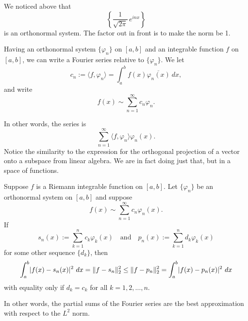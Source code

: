 We noticed above that
\begin{equation*}
\left\{ \frac{1}{\sqrt{2\pi}} \, e^{inx} \right\}
\end{equation*}
is an orthonormal system.  The factor out in front is to make the norm be 1.

Having an orthonormal system $\{ \varphi_n \}$ on $[a,b]$ and an integrable function $f$
on $[a,b]$, we can write
a Fourier series relative to $\{ \varphi_n \}$.  We let
\begin{equation*}
c_n :=
\langle f , \varphi_n \rangle
=
\int_a^b f(x) \overline{\varphi_n(x)} ~ dx ,
\end{equation*}
and write
\begin{equation*}
f(x) \sim \sum_{n=1}^\infty c_n \varphi_n .
\end{equation*}

In other words, the series is
\begin{equation*}
\sum_{n=1}^\infty \langle f , \varphi_n \rangle \varphi_n(x) .
\end{equation*}
Notice the similarity to the expression for the orthogonal
projection of a vector onto a subspace from linear algebra.  We are
in fact doing just that, but in a space of functions.

\begin{thm} \label{thm:l2bestapprox}
Suppose $f$ is a Riemann integrable function on $[a,b]$.
Let $\{ \varphi_n \}$ be an orthonormal system on $[a,b]$ and
suppose
\begin{equation*}
f(x) \sim \sum_{n=1}^\infty c_n \varphi_n(x) .
\end{equation*}
If
\begin{equation*}
s_n (x) := \sum_{k=1}^n c_k \varphi_k(x)
\quad\text{and}\quad
p_n (x) := \sum_{k=1}^n d_k \varphi_k(x)
\end{equation*}
for some other sequence $\{ d_k \}$, then
\begin{equation*}
\int_a^b \lvert {f(x)-s_n(x)} \rvert^2 ~ dx = \lVert {f-s_n} \rVert_2^2 \leq
\lVert {f-p_n} \rVert_2^2 = \int_a^b \lvert {f(x)-p_n(x)} \rvert^2 ~ dx
\end{equation*}
with equality only if $d_k = c_k$ for all $k=1,2,\ldots,n$.
\end{thm}

In other words, the partial sums of the Fourier series are the best approximation with respect to the
$L^2$ norm.


